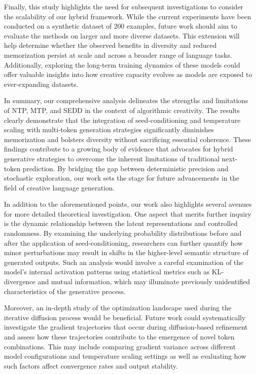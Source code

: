 \documentclass[11pt]{article}
\begin{document}
Finally, this study highlights the need for subsequent investigations to consider the scalability of our hybrid framework. While the current experiments have been conducted on a synthetic dataset of 200 examples, future work should aim to evaluate the methods on larger and more diverse datasets. This extension will help determine whether the observed benefits in diversity and reduced memorization persist at scale and across a broader range of language tasks. Additionally, exploring the long-term training dynamics of these models could offer valuable insights into how creative capacity evolves as models are exposed to ever-expanding datasets.

In summary, our comprehensive analysis delineates the strengths and limitations of NTP, MTP, and SEDD in the context of algorithmic creativity. The results clearly demonstrate that the integration of seed-conditioning and temperature scaling with multi-token generation strategies significantly diminishes memorization and bolsters diversity without sacrificing essential coherence. These findings contribute to a growing body of evidence that advocates for hybrid generative strategies to overcome the inherent limitations of traditional next-token prediction. By bridging the gap between deterministic precision and stochastic exploration, our work sets the stage for future advancements in the field of creative language generation.

In addition to the aforementioned points, our work also highlights several avenues for more detailed theoretical investigation. One aspect that merits further inquiry is the dynamic relationship between the latent representations and controlled randomness. By examining the underlying probability distributions before and after the application of seed-conditioning, researchers can further quantify how minor perturbations may result in shifts in the higher-level semantic structure of generated outputs. Such an analysis would involve a careful examination of the model’s internal activation patterns using statistical metrics such as KL-divergence and mutual information, which may illuminate previously unidentified characteristics of the generative process.

Moreover, an in-depth study of the optimization landscape used during the iterative diffusion process would be beneficial. Future work could systematically investigate the gradient trajectories that occur during diffusion-based refinement and assess how these trajectories contribute to the emergence of novel token combinations. This may include comparing gradient variance across different model configurations and temperature scaling settings as well as evaluating how such factors affect convergence rates and output stability.
\end{document}
